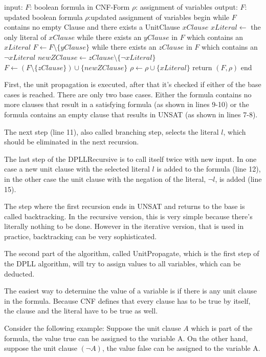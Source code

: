 \begin{algorithm}[caption={UnitPropagate}, label={algUnitProgagate}]
 input: $F$: boolean formula in CNF-Form
	$\rho$: assignment of variables
 output: $F$: updated boolean formula
	$\rho$:updated assignment of variables
 begin
   while $F$ contains no empty Clause
   and there exists a UnitClause $xClause$
       $xLiteral \gets$ the only literal of $xClause$
       while there exists an $yClause$ in $F$
       which contains an $xLiteral$
           $F \gets F \setminus \{yClause\}$     
       while there exists an $zClause$ in $F$
       which contains an $\lnot xLiteral$
           $newZClause \gets zClause \setminus \{\lnot xLiteral\}$
           $F \gets (F \setminus \{zClause\}) \cup \{newZClause\}$
       $\rho \gets \rho \cup \{xLiteral\}$
   return $(F, \rho)$
 end
\end{algorithm}


First, the unit propagation is executed, after that it's checked if either of the base cases is reached. 
There are only two base cases. Either the formula contains no more clauses that result in a satisfying formula (as shown in lines 9-10) or the formula contains an empty clause that results in UNSAT (as shown in lines 7-8).

The next step (line 11), also called branching step, selects the literal $l$, which should be eliminated in the next recursion.

The last step of the DPLLRecursive is to call itself twice with new input. In one case a new unit clause with the selected literal $l$ is added to the formula (line 12), in the other case the unit clause with the negation of the literal, $\lnot l$, is added (line 15).

The step where the first recursion ends in UNSAT and returns to the base is called backtracking. In the recursive version, this is very simple because there's literally nothing to be done. However in the iterative version, that is used in practice, backtracking can be very sophisticated.

The second part of the algorithm, called UnitPropagate, which is the first step of the DPLL algorithm, will try to assign values to all variables, which can be deducted.

The easiest way to determine the value of a variable is if there is any unit clause in the formula. Because CNF defines that every clause has to be true by itself, the clause and the literal have to be true as well.

Consider the following example: Suppose the unit clause $A$ which is part of the formula, the value true can be assigned to the variable A. On the other hand, suppose the unit clause $(\lnot A)$, the value false can be assigned to the variable A.

